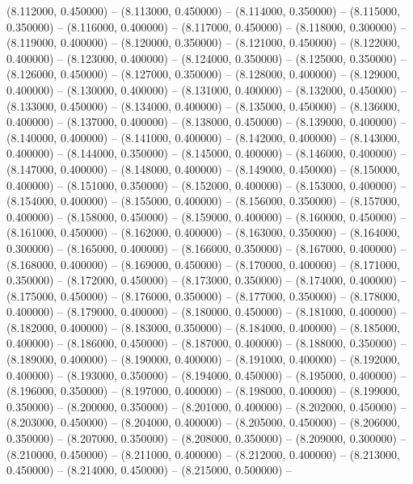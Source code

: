 (8.112000, 0.450000) -- 
(8.113000, 0.450000) -- 
(8.114000, 0.350000) -- 
(8.115000, 0.350000) -- 
(8.116000, 0.400000) -- 
(8.117000, 0.450000) -- 
(8.118000, 0.300000) -- 
(8.119000, 0.400000) -- 
(8.120000, 0.350000) -- 
(8.121000, 0.450000) -- 
(8.122000, 0.400000) -- 
(8.123000, 0.400000) -- 
(8.124000, 0.350000) -- 
(8.125000, 0.350000) -- 
(8.126000, 0.450000) -- 
(8.127000, 0.350000) -- 
(8.128000, 0.400000) -- 
(8.129000, 0.400000) -- 
(8.130000, 0.400000) -- 
(8.131000, 0.400000) -- 
(8.132000, 0.450000) -- 
(8.133000, 0.450000) -- 
(8.134000, 0.400000) -- 
(8.135000, 0.450000) -- 
(8.136000, 0.400000) -- 
(8.137000, 0.400000) -- 
(8.138000, 0.450000) -- 
(8.139000, 0.400000) -- 
(8.140000, 0.400000) -- 
(8.141000, 0.400000) -- 
(8.142000, 0.400000) -- 
(8.143000, 0.400000) -- 
(8.144000, 0.350000) -- 
(8.145000, 0.400000) -- 
(8.146000, 0.400000) -- 
(8.147000, 0.400000) -- 
(8.148000, 0.400000) -- 
(8.149000, 0.450000) -- 
(8.150000, 0.400000) -- 
(8.151000, 0.350000) -- 
(8.152000, 0.400000) -- 
(8.153000, 0.400000) -- 
(8.154000, 0.400000) -- 
(8.155000, 0.400000) -- 
(8.156000, 0.350000) -- 
(8.157000, 0.400000) -- 
(8.158000, 0.450000) -- 
(8.159000, 0.400000) -- 
(8.160000, 0.450000) -- 
(8.161000, 0.450000) -- 
(8.162000, 0.400000) -- 
(8.163000, 0.350000) -- 
(8.164000, 0.300000) -- 
(8.165000, 0.400000) -- 
(8.166000, 0.350000) -- 
(8.167000, 0.400000) -- 
(8.168000, 0.400000) -- 
(8.169000, 0.450000) -- 
(8.170000, 0.400000) -- 
(8.171000, 0.350000) -- 
(8.172000, 0.450000) -- 
(8.173000, 0.350000) -- 
(8.174000, 0.400000) -- 
(8.175000, 0.450000) -- 
(8.176000, 0.350000) -- 
(8.177000, 0.350000) -- 
(8.178000, 0.400000) -- 
(8.179000, 0.400000) -- 
(8.180000, 0.450000) -- 
(8.181000, 0.400000) -- 
(8.182000, 0.400000) -- 
(8.183000, 0.350000) -- 
(8.184000, 0.400000) -- 
(8.185000, 0.400000) -- 
(8.186000, 0.450000) -- 
(8.187000, 0.400000) -- 
(8.188000, 0.350000) -- 
(8.189000, 0.400000) -- 
(8.190000, 0.400000) -- 
(8.191000, 0.400000) -- 
(8.192000, 0.400000) -- 
(8.193000, 0.350000) -- 
(8.194000, 0.450000) -- 
(8.195000, 0.400000) -- 
(8.196000, 0.350000) -- 
(8.197000, 0.400000) -- 
(8.198000, 0.400000) -- 
(8.199000, 0.350000) -- 
(8.200000, 0.350000) -- 
(8.201000, 0.400000) -- 
(8.202000, 0.450000) -- 
(8.203000, 0.450000) -- 
(8.204000, 0.400000) -- 
(8.205000, 0.450000) -- 
(8.206000, 0.350000) -- 
(8.207000, 0.350000) -- 
(8.208000, 0.350000) -- 
(8.209000, 0.300000) -- 
(8.210000, 0.450000) -- 
(8.211000, 0.400000) -- 
(8.212000, 0.400000) -- 
(8.213000, 0.450000) -- 
(8.214000, 0.450000) -- 
(8.215000, 0.500000) -- 

